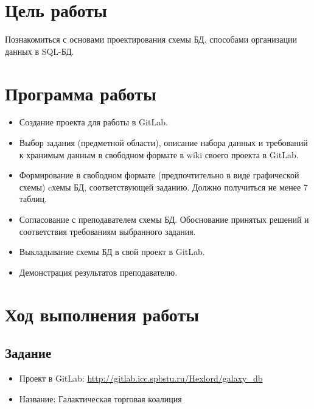 




\pagestyle{empty} 
 
\pagestyle{plain} 
\setcounter{page}{3}


\section{Цель работы}
Познакомиться с основами проектирования схемы БД, способами
организации данных в SQL-БД.

\section{Программа работы}
\begin{itemize}
\item Создание проекта для работы в GitLab.
\item Выбор задания (предметной области), описание набора данных и
требований к хранимым данным в свободном формате в wiki своего
проекта в GitLab.
\item Формирование в свободном формате (предпочтительно в виде
графической схемы) cхемы БД, соответствующей заданию. Должно
получиться не менее 7 таблиц.
\item Согласование с преподавателем схемы БД. Обоснование принятых
решений и соответствия требованиям выбранного задания.
\item Выкладывание схемы БД в свой проект в GitLab.
\item Демонстрация результатов преподавателю.
\end{itemize}

\section{Ход выполнения работы}
\subsection{Задание}
\begin{itemize}
\item Проект в GitLab: \url{http://gitlab.icc.spbstu.ru/Hexlord/galaxy_db}
\item Название: Галактическая торговая коалиция
\end{itemize}
